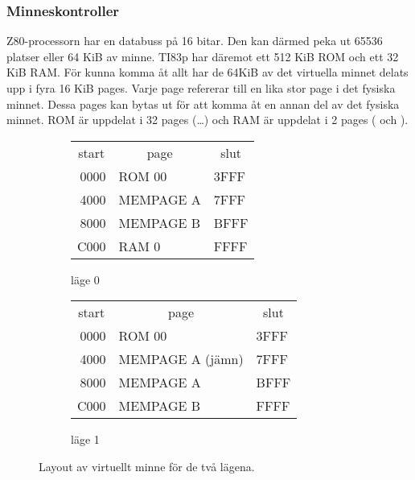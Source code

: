 \documentclass[main.tex]{subfiles}
\begin{document}
\subsubsection{Minneskontroller}
Z80-processorn har en databuss på 16 bitar. Den kan därmed peka ut 65536
platser eller 64 KiB av minne. TI83p har däremot ett 512 KiB ROM och ett 32 KiB
RAM. För kunna komma åt allt har de 64KiB av det virtuella minnet delats upp i
fyra 16 KiB pages. Varje page refererar till en lika stor page i det fysiska
minnet. Dessa pages kan bytas ut för att komma åt en annan del av det fysiska
minnet.  ROM är uppdelat i 32 pages (\dots{}) och RAM
är uppdelat i 2 pages ( och ).
\vspace{-4mm}
\begin{figure}[H]
    \begin{subfigure}{0.5\textwidth}
        \center
        \ttfamily\arraybackslash
        \small
        \begin{tabular}{r|m{3.5cm}|l}
            \multicolumn{1}{c}{\normalfont start} &
            \multicolumn{1}{c}{\normalfont page} &
            \multicolumn{1}{c}{\normalfont slut} \\ \cline{2-2}
            0000 & ROM 00    & 3FFF \\ \cline{2-2}
            4000 & MEMPAGE A & 7FFF \\ \cline{2-2}
            8000 & MEMPAGE B & BFFF \\ \cline{2-2}
            C000 & RAM 0     & FFFF \\ \cline{2-2}
        \end{tabular}
        \caption{läge 0}
    \end{subfigure}
    \begin{subfigure}{0.5\textwidth}
        \center
        \ttfamily\arraybackslash
        \begin{tabular}{r|m{3.5cm}|l}
            \multicolumn{1}{c}{\normalfont start} &
            \multicolumn{1}{c}{\normalfont page} &
            \multicolumn{1}{c}{\normalfont slut} \\ \cline{2-2}
            0000 & ROM 00           & 3FFF \\ \cline{2-2}
            4000 & MEMPAGE A (jämn) & 7FFF \\ \cline{2-2}
            8000 & MEMPAGE A        & BFFF \\ \cline{2-2}
            C000 & MEMPAGE B        & FFFF \\ \cline{2-2}
        \end{tabular}
        \caption{läge 1}
    \end{subfigure}
    \caption{Layout av virtuellt minne för de två lägena.}
    \label{fig:virtual}
\end{figure}
\end{document}
